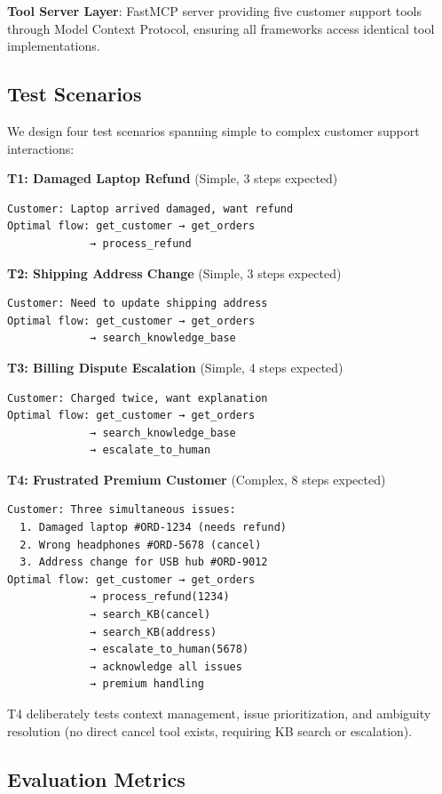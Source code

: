 \documentclass[sigconf,nonacm]{acmart}
\begin{document}
\textbf{Tool Server Layer}: FastMCP server providing five customer support tools through Model Context Protocol, ensuring all frameworks access identical tool implementations.

\subsection{Test Scenarios}

We design four test scenarios spanning simple to complex customer support interactions:

\textbf{T1: Damaged Laptop Refund} (Simple, 3 steps expected)
\begin{verbatim}
Customer: Laptop arrived damaged, want refund
Optimal flow: get_customer → get_orders
             → process_refund
\end{verbatim}

\textbf{T2: Shipping Address Change} (Simple, 3 steps expected)
\begin{verbatim}
Customer: Need to update shipping address
Optimal flow: get_customer → get_orders
             → search_knowledge_base
\end{verbatim}

\textbf{T3: Billing Dispute Escalation} (Simple, 4 steps expected)
\begin{verbatim}
Customer: Charged twice, want explanation
Optimal flow: get_customer → get_orders
             → search_knowledge_base
             → escalate_to_human
\end{verbatim}

\textbf{T4: Frustrated Premium Customer} (Complex, 8 steps expected)
\begin{verbatim}
Customer: Three simultaneous issues:
  1. Damaged laptop #ORD-1234 (needs refund)
  2. Wrong headphones #ORD-5678 (cancel)
  3. Address change for USB hub #ORD-9012
Optimal flow: get_customer → get_orders
             → process_refund(1234)
             → search_KB(cancel)
             → search_KB(address)
             → escalate_to_human(5678)
             → acknowledge all issues
             → premium handling
\end{verbatim}

T4 deliberately tests context management, issue prioritization, and ambiguity resolution (no direct cancel tool exists, requiring KB search or escalation).

\subsection{Evaluation Metrics}
\end{document}
